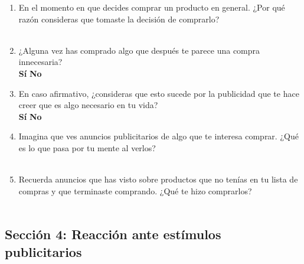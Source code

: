 \begin{enumerate}[resume]

    \item En el momento en que decides comprar un producto en general.
    ¿Por qué razón consideras que tomaste la decisión de comprarlo? \\
    \underline{\hspace{\linewidth}} \\
    \underline{\hspace{\linewidth}}

    \item ¿Alguna vez has comprado algo que después te parece una compra
    innecesaria? \\
    \textbf{Sí} \quad \textbf{No}

    \item En caso afirmativo, ¿consideras que esto sucede por la publicidad que
    te hace creer que es algo necesario en tu vida? \\
    \textbf{Sí} \quad \textbf{No}

    \item Imagina que ves anuncios publicitarios de algo que te interesa
    comprar. ¿Qué es lo que pasa por tu mente al verlos? \\
    \underline{\hspace{\linewidth}} \\
    \underline{\hspace{\linewidth}}

    \item Recuerda anuncios que has visto sobre productos que no tenías en tu
    lista de compras y que terminaste comprando. ¿Qué te hizo comprarlos? \\
    \underline{\hspace{\linewidth}} \\
    \underline{\hspace{\linewidth}}

\end{enumerate}

\subsection*{Sección 4: Reacción ante estímulos publicitarios}

